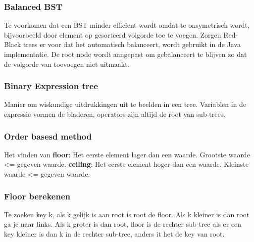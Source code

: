\subsubsection{Balanced BST}
Te voorkomen dat een BST minder efficient wordt omdat te onsymetrisch wordt, bijvoorbeeld door element op gesorteerd volgorde toe te voegen.
Zorgen Red-Black trees er voor dat het automatisch balanceert, wordt gebruikt in de Java implementatie.
De root node wordt aangepast om gebalanceert te blijven zo dat de volgorde van toevoegen niet uitmaakt.

\subsubsection{Binary Expression tree}
Manier om wiskundige uitdrukkingen uit te beelden in een tree.
Variablen in de expressie vormen de bladeren, operators zijn altijd de root van sub-trees.

\subsubsection{Order basesd method}
Het vinden van 
\textbf{floor}: Het eerste element lager dan een waarde.
Grootste waarde <= gegeven waarde.
\textbf{ceiling}: Het eerste element hoger dan een waarde.
Kleinste waarde <= gegeven waarde.

\subsubsection{Floor berekenen}
Te zoeken key k, als k gelijk is aan root is root de floor.
Als k kleiner is dan root ga je naar links.
Als k groter is dan root, floor is de rechter sub-tree als er een key kleiner is dan k in de rechter sub-tree, anders it het de key van root.
